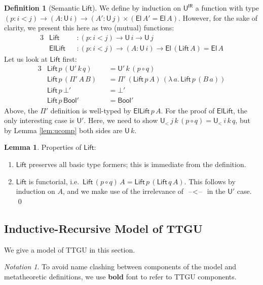 \documentclass[a4paper,UKenglish,cleveref, autoref, thm-restate]{lipics-v2021}
\theoremstyle{remark}
\newtheorem{notation}{Notation}
\theoremstyle{definition}
\newtheorem{mydefinition}{Definition}
\newtheorem{mylemma}{Lemma}
\newcommand{\U}{\mathsf{U}}
\newcommand{\El}{\mathsf{El}}
\newcommand{\blank}{\mathord{\hspace{1pt}\text{--}\hspace{1pt}}}
\newcommand{\Bool}{\mathsf{Bool}}
\newcommand{\Lift}{\mathsf{Lift}}
\renewcommand{\U}{\mathsf{U}}
\newcommand{\msf}[1]{\mathsf{#1}}
\newcommand{\uir}{\msf{U^{IR}}}
\newcommand{\ult}{\U_{<}}
\begin{document}
\begin{mydefinition}[Semantic $\Lift$]
We define by induction on $\uir$ a function with type $(p : i < j)\to(A : \U\,i)
\to (A' : \U\,j)\times(\El\,A' = \El\,A)$. However, for the sake of clarity, we
present this here as two (mutual) functions:
\begin{alignat*}{3}
  &\Lift\,      &&: (p : i < j) \to \U\,i \to \U\,j\\
  &\msf{ElLift} &&: (p : i < j)\to(A : \U\,i) \to \El\,(\Lift\,A) = \El\,A
\end{alignat*}
Let us look at $\Lift$ first:
\begin{alignat*}{3}
  &\Lift\,p\,(\U'\,k\,q)    &&= \U'\,k\,(p \circ q)\\
  &\Lift\,p\,(\Pi'\,A\,B)   &&= \Pi'\,(\Lift\,p\,A)\,(\lambda\,a.\,\Lift\,p\,(B\,a))\\
  &\Lift\,p\,\bot'          &&= \bot'\\
  &\Lift\,p\,\Bool'         &&= \Bool'
\end{alignat*}
Above, the $\Pi'$ definition is well-typed by $\msf{ElLift}\,p\,A$. For the proof of $\msf{ElLift}$,
the only interesting case is $\U'$. Here, we need to show $\ult\,j\,k\,(p \circ q) = \ult\,i\,k\,q$,
but by Lemma \ref{lem:ucomp} both sides are $\U\,k$.
\end{mydefinition}

\begin{mylemma}\label{lem:liftprop} Properties of $\Lift$:
\begin{enumerate}
  \item $\Lift$ preserves all basic type formers; this is immediate from the definition.
  \item $\Lift$ is functorial, i.e.\ $\Lift\,(p \circ q)\,A = \Lift\,p\,(\Lift\,q\,A)$. This follows
    by induction on $A$, and we make use of the irrelevance of $\blank\!<\!\blank$ in the $\U'$ case.
    \qed
\end{enumerate}
\end{mylemma}

\subsection{Inductive-Recursive Model of TTGU}

We give a model of TTGU in this section.

\begin{notation} To avoid name clashing between components of the model and metatheoretic
definitions, we use \textbf{bold} font to refer to TTGU components.
\end{notation}
\end{document}
